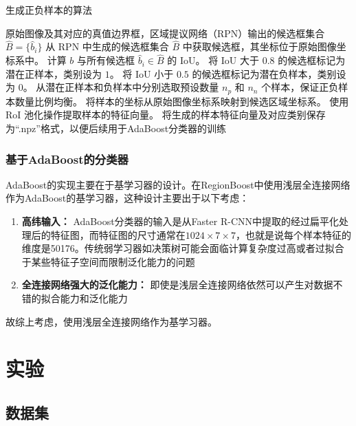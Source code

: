 \documentclass[a4paper,12pt]{ctexart}
\begin{document}
\begin{algorithm}[H]
    \caption{生成正负样本的算法}
    \label{alg:sample_generation}
    \begin{algorithmic}[1]
        \REQUIRE 原始图像及其对应的真值边界框，区域提议网络（RPN）输出的候选框集合 $\hat{B} = \{\hat{b}_{i}\}$
        \STATE 从 RPN 中生成的候选框集合 $\hat{B}$ 中获取候选框，其坐标位于原始图像坐标系中。
            \STATE 计算 $b$ 与所有候选框 $\hat{b}_{i} \in \hat{B}$ 的 IoU。
            \STATE 将 IoU 大于 $0.8$ 的候选框标记为潜在正样本，类别设为 $1$。
            \STATE 将 IoU 小于 $0.5$ 的候选框标记为潜在负样本，类别设为 $0$。
        \ENDFOR
        \STATE 从潜在正样本和负样本中分别选取预设数量 $n_p$ 和 $n_n$ 个样本，保证正负样本数量比例均衡。
            \STATE 将样本的坐标从原始图像坐标系映射到候选区域坐标系。
            \STATE 使用 RoI 池化操作提取样本的特征向量。
        \ENDFOR
        \STATE 将生成的样本特征向量及对应类别保存为“.npz”格式，以便后续用于AdaBoost分类器的训练
    \end{algorithmic}
\end{algorithm}

\subsubsection{基于AdaBoost的分类器}

AdaBoost的实现主要在于基学习器的设计。在RegionBoost中使用浅层全连接网络作为AdaBoost的基学习器，这种设计主要出于以下考虑：
\begin{enumerate}
    \item \textbf{高纬输入：} AdaBoost分类器的输入是从Faster R-CNN中提取的经过扁平化处理后的特征图，而特征图的尺寸通常在$1024\times7\times 7$，也就是说每个样本特征的维度是50176。传统弱学习器如决策树可能会面临计算复杂度过高或者过拟合于某些特征子空间而限制泛化能力的问题
    \item \textbf{全连接网络强大的泛化能力：} 即使是浅层全连接网络依然可以产生对数据不错的拟合能力和泛化能力
\end{enumerate}
故综上考虑，使用浅层全连接网络作为基学习器。



\section{实验}

\subsection{数据集}
\end{document}
